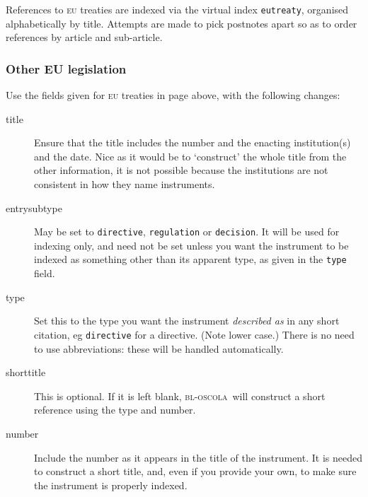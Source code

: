 \documentclass[a4paper,
               11pt,
	       DIV=1,			   
	       footinclude=false]
	      {scrartcl}
\newcommand{\oscola}{\textsc{bl-oscola}}
\begin{document}
References to \textsc{eu} treaties are indexed via the virtual index
\texttt{eutreaty}, organised alphabetically by title. Attempts are
made to pick postnotes apart so as to order references by article and
sub-article.

\subsubsection{Other EU legislation}

Use the fields given for \textsc{eu} treaties in page
\pageref{eutreaties} above, with the following changes:

\begin{description}
  \item[title] 
Ensure that the title includes the number and the
  enacting institution(s) and the date. Nice as it would be to
  `construct' the whole title from the other information, it is not
  possible because the institutions are not consistent in how they
  name instruments.
  \item[entrysubtype] 
  May be set to \texttt{directive},
  \texttt{regulation} or \texttt{decision}. It will be used for
  indexing only, and need not be set unless you want the instrument to
  be indexed as something other than its apparent type, as
  given in the \texttt{type} field.
  \item[type]
    Set this to the type you want the instrument
  \emph{described as}
  in any short citation, eg \texttt{directive} for a directive. 
  (Note lower case.) There is no need to use abbreviations: these 
  will be handled automatically.
  \item[shorttitle] 
  This is optional. If it is left blank,
  \oscola\ will construct a short reference using the type and number.
  \item[number] 
  Include the number as it appears in the title of
  the instrument. It is needed to construct a short title, and, even
  if you provide your own, to make sure the instrument is properly
  indexed.
\end{description}
\end{document}

